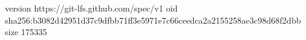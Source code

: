 version https://git-lfs.github.com/spec/v1
oid sha256:b3082d42951d37c9dfbb71ff3e5971e7c66ceedca2a2155258ae3c98d68f2dbb
size 175335
